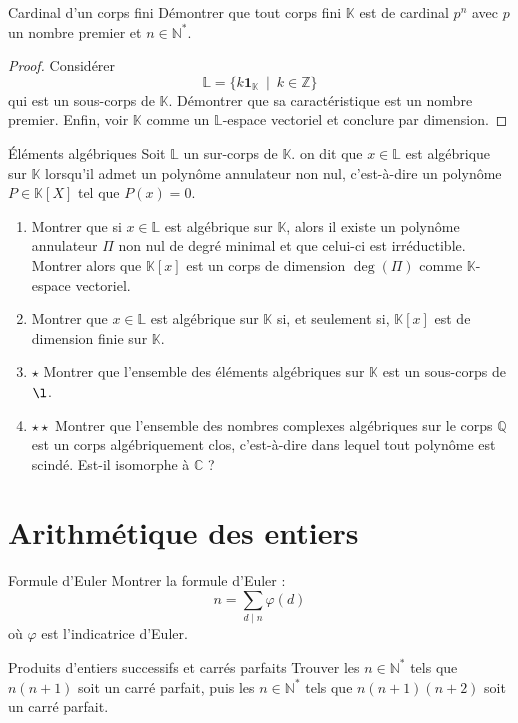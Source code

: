 \documentclass[french,a4paper]{article}
\newcommand{\N}{\mathbb{N}}
\newcommand{\Z}{\mathbb{Z}}
\newcommand{\Q}{\mathbb{Q}}
\newcommand{\C}{\mathbb{C}}
\newcommand{\K}{\mathbb{K}}
\renewcommand{\L}{\mathbb{L}}
\newcommand{\st}{^*}
\theoremstyle{plain}
\theoremstyle{definition}
\theoremstyle{remark}
\begin{document}
\begin{ex}{Cardinal d'un corps fini}
	Démontrer que tout corps fini $\K$ est de cardinal $p^n$ avec $p$ un nombre premier et $n\in\N\st$.
\end{ex}

\begin{proof}
	Considérer $$\L=\{k\mathbf{1}_\K \ \mid \ k\in\Z\}$$ qui est un sous-corps de $\K$. Démontrer que sa caractéristique est un nombre premier. Enfin, voir $\K$ comme un $\L$-espace vectoriel et conclure par dimension.
\end{proof}

\begin{ex}[Moulin.45]{Éléments algébriques}
	Soit $\L$ un sur-corps de $\K$. on dit que $x\in\L$ est algébrique sur $\K$ lorsqu'il admet un polynôme annulateur non nul, c'est-à-dire un polynôme $P\in\K[X]$ tel que $P(x)=0$.
	\begin{enumerate}
		\item Montrer que si $x\in\L$ est algébrique sur $\K$, alors il existe un polynôme annulateur $\Pi$ non nul de degré minimal et que celui-ci est irréductible. Montrer alors que $\K[x]$ est un corps de dimension $\deg(\Pi)$ comme $\K$-espace vectoriel.
		\item Montrer que $x\in\L$ est algébrique sur $\K$ si, et seulement si, $\K[x]$ est de dimension finie sur $\K$.
		\item $\star$ Montrer que l'ensemble des éléments algébriques sur $\K$ est un sous-corps de $\l$.
		\item $\star\star$ Montrer que l'ensemble des nombres complexes algébriques sur le corps $\Q$ est un corps algébriquement clos, c'est-à-dire dans lequel tout polynôme est scindé. Est-il isomorphe à $\C$ ?
	\end{enumerate}
\end{ex}

\section{Arithmétique des entiers}

\begin{ex}[Moulin.46]{Formule d'Euler}
	Montrer la formule d'Euler : $$n=\sum_{d\mid n}\varphi(d)$$ où $\varphi$ est l'indicatrice d'Euler.
\end{ex}

\begin{ex}[Moulin.47]{Produits d'entiers successifs et carrés parfaits}
	Trouver les $n\in\N\st$ tels que $n(n+1)$ soit un carré parfait, puis les $n\in\N\st$ tels que $n(n+1)(n+2)$ soit un carré parfait.
\end{ex}
\end{document}
